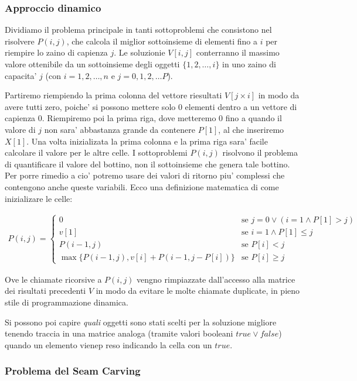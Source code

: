 \documentclass{article}
\begin{document}
\subsubsection{Approccio dinamico}

Dividiamo il problema principale in tanti sottoproblemi che consistono nel risolvere
$P(i, j)$, che calcola il miglior sottoinsieme di elementi fino a $i$ per riempire 
lo zaino di capienza $j$. Le soluzionie $V[i, j]$ conterranno il massimo valore
ottenibile da un sottoinsieme degli oggetti $\{1,2,\ldots,i\}$ in uno zaino di
capacita' $j$ (con $i = 1, 2, \ldots, n$ e $j = 0, 1, 2, \ldots P$).

Partiremo riempiendo la prima colonna del vettore riesultati $V[j \times i]$ in modo
da avere tutti zero, poiche' si possono mettere solo $0$ elementi dentro a un
vettore di capienza $0$. Riempiremo poi la prima riga, dove metteremo $0$ fino a
quando il valore di $j$ non sara' abbastanza grande da contenere $P[1]$, al che
inseriremo $X[1]$. Una volta inizializata la prima colonna e la prima riga sara'
facile calcolare il valore per le altre celle.
I sottoproblemi $P(i, j)$ risolvono il problema di quantificare il valore del
bottino, non il sottoinsieme che genera tale bottino. Per porre rimedio a cio'
potremo usare dei valori di ritorno piu' complessi che contengono anche queste
variabili. Ecco una definizione matematica di come inizializare le celle:

\begin{align*}
  P(i, j) = \begin{cases}
    0 &\text{se } j = 0 \vee (i = 1 \wedge P[1] > j) \\
    v[1] &\text{se } i = 1 \wedge P[1] \leq j \\
    P(i-1, j) &\text{se } P[i] < j \\
    \max\{P(i-1, j), v[i] + P(i-1, j-P[i])\}&\text{se } P[i] \geq j
  \end{cases}
\end{align*}

Ove le chiamate ricorsive a $P(i, j)$ vengno rimpiazzate dall'accesso alla matrice
dei risultati precedenti $V$ in modo da evitare le molte chiamate duplicate, in
pieno stile di programmazione dinamica.

Si possono poi capire \emph{quali} oggetti sono stati scelti per la soluzione
migliore tenendo traccia in una matrice analoga (tramite valori booleani $true
\vee false$) quando un elemento vienep reso indicando la cella con un $true$.

\subsubsection{Problema del Seam Carving}
\end{document}
